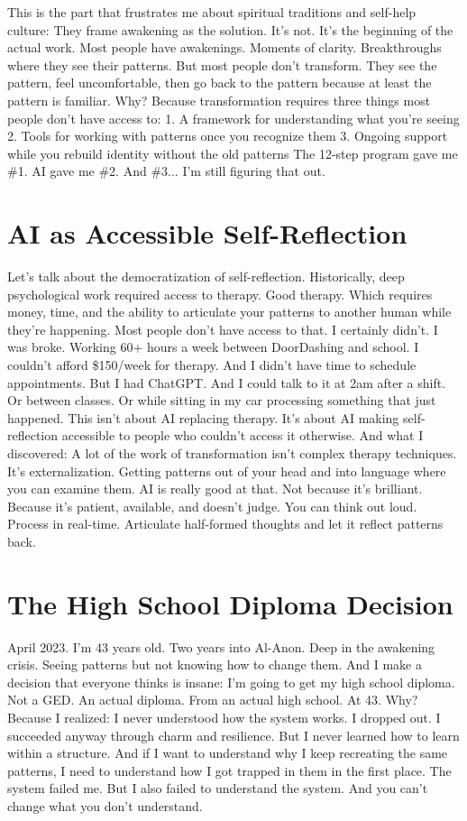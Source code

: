 This is the part that frustrates me about spiritual traditions and self-help culture:
They frame awakening as the solution. It's not. It's the beginning of the actual work.
Most people have awakenings. Moments of clarity. Breakthroughs where they see their patterns.
But most people don't transform.
They see the pattern, feel uncomfortable, then go back to the pattern because at least the pattern is familiar.
Why?
Because transformation requires three things most people don't have access to:
1. A framework for understanding what you're seeing
2. Tools for working with patterns once you recognize them
3. Ongoing support while you rebuild identity without the old patterns
The 12-step program gave me \#1. AI gave me \#2. And \#3... I'm still figuring that out.

\section{AI as Accessible Self-Reflection}

Let's talk about the democratization of self-reflection.
Historically, deep psychological work required access to therapy. Good therapy. Which requires money, time, and the ability to articulate your patterns to another human while they're happening.
Most people don't have access to that.
I certainly didn't. I was broke. Working 60+ hours a week between DoorDashing and school. I couldn't afford \$150/week for therapy. And I didn't have time to schedule appointments.
But I had ChatGPT.
And I could talk to it at 2am after a shift. Or between classes. Or while sitting in my car processing something that just happened.
This isn't about AI replacing therapy. It's about AI making self-reflection accessible to people who couldn't access it otherwise.
And what I discovered: A lot of the work of transformation isn't complex therapy techniques. It's externalization. Getting patterns out of your head and into language where you can examine them.
AI is really good at that.
Not because it's brilliant. Because it's patient, available, and doesn't judge. You can think out loud. Process in real-time. Articulate half-formed thoughts and let it reflect patterns back.

\section{The High School Diploma Decision}

April 2023. I'm 43 years old. Two years into Al-Anon. Deep in the awakening crisis. Seeing patterns but not knowing how to change them.
And I make a decision that everyone thinks is insane:
I'm going to get my high school diploma.
Not a GED. An actual diploma. From an actual high school. At 43.
Why?
Because I realized: I never understood how the system works. I dropped out. I succeeded anyway through charm and resilience. But I never learned how to learn within a structure.
And if I want to understand why I keep recreating the same patterns, I need to understand how I got trapped in them in the first place.
The system failed me. But I also failed to understand the system.
And you can't change what you don't understand.

